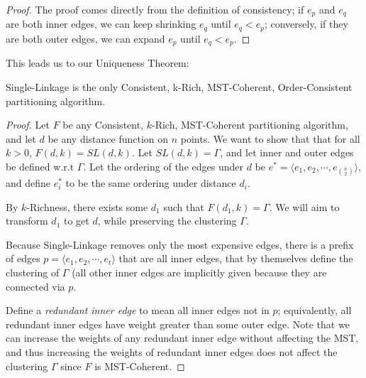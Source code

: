 \begin{proof}
    The proof comes directly from the definition of consistency; if $e_p$ and $e_q$ are both inner edges, we can keep shrinking $e_q$ until $e_q < e_p$; conversely, if they are both outer edges, we can expand $e_p$ until $e_q < e_p$.
\end{proof}

This leads us to our Uniqueness Theorem:

\begin{theorem}
    Single-Linkage is the only Consistent, k-Rich, MST-Coherent, Order-Consistent partitioning algorithm.
\end{theorem}

\begin{proof}
    Let $F$ be any Consistent, $k$-Rich, MST-Coherent partitioning algorithm, and let $d$ be any distance function on $n$ points. We want to show that that for all $k > 0$, $F(d, k) = SL(d, k)$. Let $SL(d,k) = \Gamma$, and let inner and outer edges be defined w.r.t $\Gamma$. Let the ordering of the edges under $d$ be $e^* = \langle e_1, e_2, \cdots, e_{\binom{n}{2}} \rangle$, and define $e^*_i$ to be the same ordering under distance $d_i$.
    
    By $k$-Richness, there exists some $d_1$ such that $F(d_1,k) = \Gamma$. We will aim to transform $d_1$ to get $d$, while preserving the clustering $\Gamma$. 
    
    Because Single-Linkage removes only the most expensive edges, there is a prefix of edges $p = \langle e_1, e_2, \cdots, e_t \rangle$ that are all inner edges, that by themselves define the clustering of $\Gamma$ (all other inner edges are implicitly given because they are connected via $p$.
    
    Define a \textit{redundant inner edge} to mean all inner edges not in $p$; equivalently, all redundant inner edges have weight greater than some outer edge. Note that we can increase the weights of any redundant inner edge without affecting the MST, and thus increasing the weights of redundant inner edges does not affect the clustering $\Gamma$ since $F$ is MST-Coherent.
    

\end{proof}
